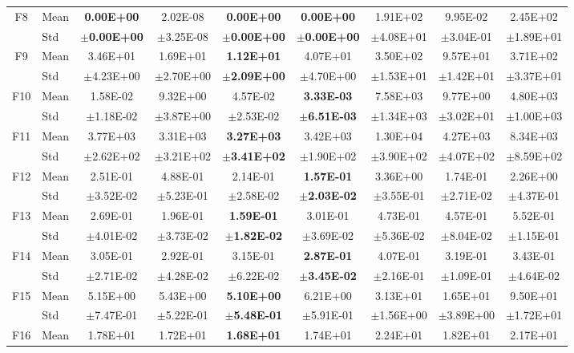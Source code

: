 \begin{table}[htbp]
{\begin{tabular}{clccccccc}
F8 & Mean & \textbf{0.00E+00} & 2.02E-08 & \textbf{0.00E+00} & \textbf{0.00E+00} & 1.91E+02 & 9.95E-02 & 2.45E+02 \\
 & Std & $\pm$\textbf{0.00E+00} & $\pm$3.25E-08 & $\pm$\textbf{0.00E+00} & $\pm$\textbf{0.00E+00} & $\pm$4.08E+01 & $\pm$3.04E-01 & $\pm$1.89E+01 \\
F9 & Mean & 3.46E+01 & 1.69E+01 & \textbf{1.12E+01} & 4.07E+01 & 3.50E+02 & 9.57E+01 & 3.71E+02 \\
 & Std & $\pm$4.23E+00 & $\pm$2.70E+00 & $\pm$\textbf{2.09E+00} & $\pm$4.70E+00 & $\pm$1.53E+01 & $\pm$1.42E+01 & $\pm$3.37E+01 \\
F10 & Mean & 1.58E-02 & 9.32E+00 & 4.57E-02 & \textbf{3.33E-03} & 7.58E+03 & 9.77E+00 & 4.80E+03 \\
 & Std & $\pm$1.18E-02 & $\pm$3.87E+00 & $\pm$2.53E-02 & $\pm$\textbf{6.51E-03} & $\pm$1.34E+03 & $\pm$3.02E+01 & $\pm$1.00E+03 \\
F11 & Mean & 3.77E+03 & 3.31E+03 & \textbf{3.27E+03} & 3.42E+03 & 1.30E+04 & 4.27E+03 & 8.34E+03 \\
 & Std & $\pm$2.62E+02 & $\pm$3.21E+02 & $\pm$\textbf{3.41E+02} & $\pm$1.90E+02 & $\pm$3.90E+02 & $\pm$4.07E+02 & $\pm$8.59E+02 \\
F12 & Mean & 2.51E-01 & 4.88E-01 & 2.14E-01 & \textbf{1.57E-01} & 3.36E+00 & 1.74E-01 & 2.26E+00 \\
 & Std & $\pm$3.52E-02 & $\pm$5.23E-01 & $\pm$2.58E-02 & $\pm$\textbf{2.03E-02} & $\pm$3.55E-01 & $\pm$2.71E-02 & $\pm$4.37E-01 \\
F13 & Mean & 2.69E-01 & 1.96E-01 & \textbf{1.59E-01} & 3.01E-01 & 4.73E-01 & 4.57E-01 & 5.52E-01 \\
 & Std & $\pm$4.01E-02 & $\pm$3.73E-02 & $\pm$\textbf{1.82E-02} & $\pm$3.69E-02 & $\pm$5.36E-02 & $\pm$8.04E-02 & $\pm$1.15E-01 \\
F14 & Mean & 3.05E-01 & 2.92E-01 & 3.15E-01 & \textbf{2.87E-01} & 4.07E-01 & 3.19E-01 & 3.43E-01 \\
 & Std & $\pm$2.71E-02 & $\pm$4.28E-02 & $\pm$6.22E-02 & $\pm$\textbf{3.45E-02} & $\pm$2.16E-01 & $\pm$1.09E-01 & $\pm$4.64E-02 \\
F15 & Mean & 5.15E+00 & 5.43E+00 & \textbf{5.10E+00} & 6.21E+00 & 3.13E+01 & 1.65E+01 & 9.50E+01 \\
 & Std & $\pm$7.47E-01 & $\pm$5.22E-01 & $\pm$\textbf{5.48E-01} & $\pm$5.91E-01 & $\pm$1.56E+00 & $\pm$3.89E+00 & $\pm$1.72E+01 \\
F16 & Mean & 1.78E+01 & 1.72E+01 & \textbf{1.68E+01} & 1.74E+01 & 2.24E+01 & 1.82E+01 & 2.17E+01 \\

\end{tabular}}
\end{table}
